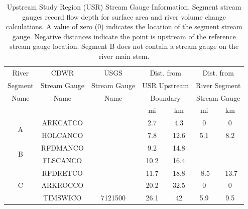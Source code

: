 \begin{linenumbers}
\begin{table}[htbp]
\centering
  \caption[Upstream Study Region (USR) Stream Gauge Information.]{Upstream Study Region (USR) Stream Gauge Information.  Segment stream gauges record flow depth for surface area and river volume change calculations.  A value of zero (0) indicates the location of the segment stream gauge.  Negative distances indicate the point is upstream of the reference stream gauge location. Segment B does not contain a stream gauge on the river main stem.}
    \label{tab:USRGauges}
\begin{tabular}{ccccccc}
	\toprule
	                      River                       &     CDWR     &     USGS     &  \multicolumn{2}{c}{Dist. from}  &  \multicolumn{2}{c}{Dist. from}   \\
	                     Segment                      & Stream Gauge & Stream Gauge & \multicolumn{2}{c}{USR Upstream} & \multicolumn{2}{c}{River Segment} \\
	                      Name                        &     Name     &     Name     &   \multicolumn{2}{c}{Boundary}   & \multicolumn{2}{c}{Stream Gauge}  \\
	\cmidrule(r{.5em}l){4-5} \cmidrule(r{.5em}l){6-7} &              &              &  mi  &            km             &  mi  &             km             \\ \toprule
	               \multirow{2}{*}{A}                 &   ARKCATCO   &              & 2.7  &            4.3            &  0   &             0              \\
	                                                  &   HOLCANCO   &              & 7.8  &           12.6            & 5.1  &            8.2             \\ \midrule
	               \multirow{2}{*}{B}                 &   RFDMANCO   &              & 9.2  &           14.8            &      &  \\
	                                                  &   FLSCANCO   &              & 10.2 &           16.4            &      &  \\ \midrule
	               \multirow{4}{*}{C}                 &   RFDRETCO   &              & 11.7 &           18.8            & -8.5 &           -13.7            \\
	                                                  &   ARKROCCO   &              & 20.2 &           32.5            &  0   &             0              \\
	                                                  &   TIMSWICO   &   7121500    & 26.1 &            42             & 5.9  &            9.5             \\

\end{tabular}
\end{table}
\end{linenumbers}
